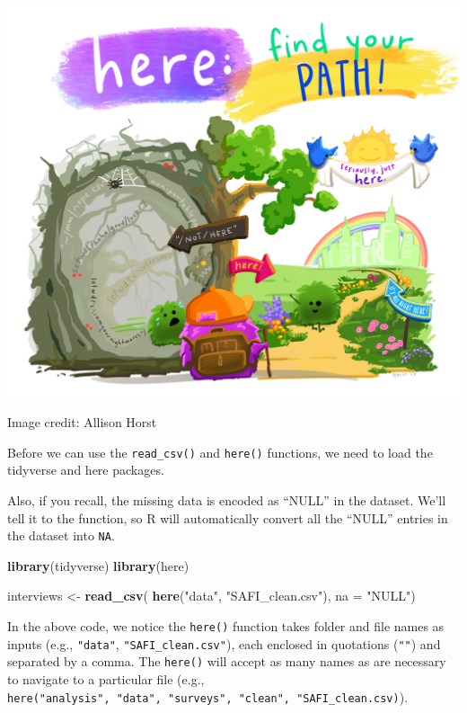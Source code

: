 \documentclass[
]{article}
\newenvironment{Shaded}{\begin{snugshade}}{\end{snugshade}}
\newcommand{\AttributeTok}[1]{\textcolor[rgb]{0.13,0.29,0.53}{#1}}
\newcommand{\FunctionTok}[1]{\textcolor[rgb]{0.13,0.29,0.53}{\textbf{#1}}}
\newcommand{\NormalTok}[1]{#1}
\newcommand{\OtherTok}[1]{\textcolor[rgb]{0.56,0.35,0.01}{#1}}
\newcommand{\StringTok}[1]{\textcolor[rgb]{0.31,0.60,0.02}{#1}}
\begin{document}
\includegraphics[width=1\linewidth,alt={Monsters at a fork in the road, with signs saying here, and not here. One direction, not here, leads to a scary dark forest with spiders and absolute filepaths, while the other leads to a sunny, green meadow, and a city below a rainbow and a world free of absolute filepaths. Art by Allison Horst}]{fig/here_horst}

Image credit: Allison Horst

Before we can use the \texttt{read\_csv()} and \texttt{here()}
functions, we need to load the tidyverse and here packages.

Also, if you recall, the missing data is encoded as ``NULL'' in the
dataset. We'll tell it to the function, so R will automatically convert
all the ``NULL'' entries in the dataset into \texttt{NA}.

\begin{Shaded}
\begin{Highlighting}[]
\FunctionTok{library}\NormalTok{(tidyverse)}
\FunctionTok{library}\NormalTok{(here)}

\NormalTok{interviews }\OtherTok{\textless{}{-}} \FunctionTok{read\_csv}\NormalTok{(}
  \FunctionTok{here}\NormalTok{(}\StringTok{"data"}\NormalTok{, }\StringTok{"SAFI\_clean.csv"}\NormalTok{), }
  \AttributeTok{na =} \StringTok{"NULL"}\NormalTok{)}
\end{Highlighting}
\end{Shaded}

In the above code, we notice the \texttt{here()} function takes folder
and file names as inputs (e.g., \texttt{"data"},
\texttt{"SAFI\_clean.csv"}), each enclosed in quotations (\texttt{""})
and separated by a comma. The \texttt{here()} will accept as many names
as are necessary to navigate to a particular file (e.g.,
\texttt{here("analysis",\ "data",\ "surveys",\ "clean",\ "SAFI\_clean.csv)}).
\end{document}
